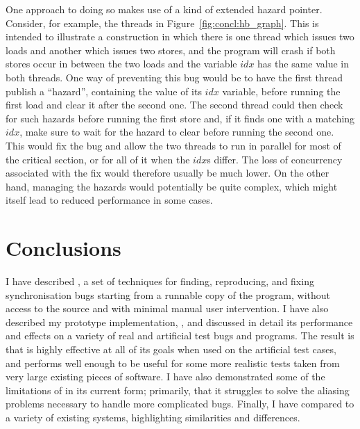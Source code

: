 One approach to doing so makes use of a kind of extended hazard
pointer\cite{Michael2004}.  Consider, for example, the threads in
Figure~\ref{fig:concl:hb_graph}.  This is intended to illustrate a
construction in which there is one thread which issues two loads and
another which issues two stores, and the program will crash if both
stores occur in between the two loads and the variable $\mathit{idx}$
has the same value in both threads.  One way of preventing this bug
would be to have the first thread publish a ``hazard'', containing the
value of its $\mathit{idx}$ variable, before running the first load
and clear it after the second one.  The second thread could then check
for such hazards before running the first store and, if it finds one
with a matching $\mathit{idx}$, make sure to wait for the hazard to
clear before running the second one.  This would fix the bug and allow
the two threads to run in parallel for most of the critical section,
or for all of it when the $\mathit{idx}$s differ.  The loss of
concurrency associated with the fix would therefore usually be much
lower.  On the other hand, managing the hazards would potentially be
quite complex, which might itself lead to reduced performance in some
cases.

\section{Conclusions}

I have described {\technique}, a set of techniques for finding,
reproducing, and fixing synchronisation bugs starting from a runnable
copy of the program, without access to the source and with minimal
manual user intervention.  I have also described my prototype
implementation, {\implementation}, and discussed in detail its
performance and effects on a variety of real and artificial test bugs
and programs.  The result is that {\technique} is highly effective at
all of its goals when used on the artificial test cases, and performs
well enough to be useful for some more realistic tests taken from very
large existing pieces of software.  I have also demonstrated some of
the limitations of {\technique} in its current form; primarily, that
it struggles to solve the aliasing problems necessary to handle more
complicated bugs.  Finally, I have compared {\technique} to a variety
of existing systems, highlighting similarities and differences.

